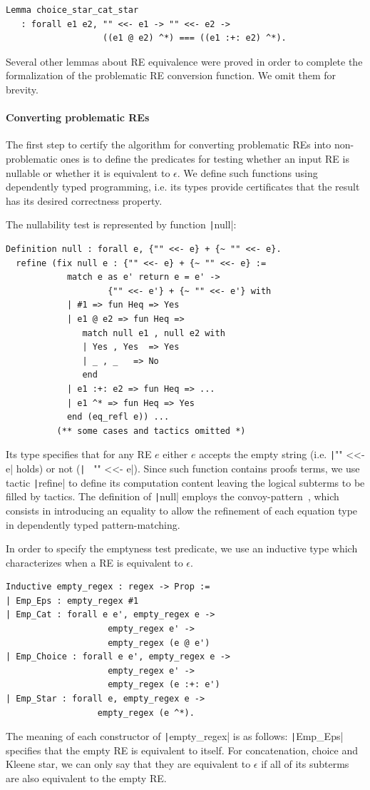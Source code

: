 \documentclass[review]{elsarticle}
\newcommand{\coq}[1]{\texttt|#1|}
\theoremstyle{definition}
\begin{document}
\begin{verbatim}
Lemma choice_star_cat_star 
   : forall e1 e2, "" <<- e1 -> "" <<- e2 ->
                   ((e1 @ e2) ^*) === ((e1 :+: e2) ^*). 

\end{verbatim}
Several other lemmas about RE equivalence were proved in order to complete
the formalization of the problematic RE conversion function. We omit them
for brevity.

\paragraph{Converting problematic REs} The first step to certify the algorithm
for converting problematic REs into non-problematic ones is to define the
predicates for testing whether an input RE is nullable or whether it is equivalent to
$\epsilon$. We define such functions using dependently typed programming, i.e.
its types provide certificates that the result has its desired correctness
property.

The nullability test is represented by function \coq{null}:
\begin{verbatim}
Definition null : forall e, {"" <<- e} + {~ "" <<- e}.
  refine (fix null e : {"" <<- e} + {~ "" <<- e} :=
            match e as e' return e = e' -> 
                    {"" <<- e'} + {~ "" <<- e'} with
            | #1 => fun Heq => Yes
            | e1 @ e2 => fun Heq =>
               match null e1 , null e2 with
               | Yes , Yes  => Yes
               | _ , _   => No
               end 
            | e1 :+: e2 => fun Heq => ...
            | e1 ^* => fun Heq => Yes
            end (eq_refl e)) ...
          (** some cases and tactics omitted *)
\end{verbatim}
Its type specifies that for any RE $e$ either $e$ accepts the empty string (i.e.
\coq{"" <<- e} holds) or not (\coq{~ "" <<- e}). Since such function contains
proofs terms, we use tactic \coq{refine} to define its computation content
leaving the logical subterms to be filled by tactics. The definition of
\coq{null} employs the convoy-pattern~\cite{Chlipala13}, which consists in
introducing an equality to allow the refinement of each equation type in
dependently typed pattern-matching.

In order to specify the emptyness test predicate, we use an inductive type
which characterizes when a RE is equivalent to $\epsilon$.
\begin{verbatim}
Inductive empty_regex : regex -> Prop :=
| Emp_Eps : empty_regex #1
| Emp_Cat : forall e e', empty_regex e ->
                    empty_regex e' ->
                    empty_regex (e @ e')
| Emp_Choice : forall e e', empty_regex e ->
                    empty_regex e' ->
                    empty_regex (e :+: e')
| Emp_Star : forall e, empty_regex e ->
                  empty_regex (e ^*).
\end{verbatim}
The meaning of each constructor of \coq{empty_regex} is as follows:
\coq{Emp_Eps} specifies that the empty RE is equivalent to itself.
For concatenation, choice and Kleene star, we can only say that they are
equivalent to $\epsilon$ if all of its subterms are also equivalent
to the empty RE.
\end{document}
